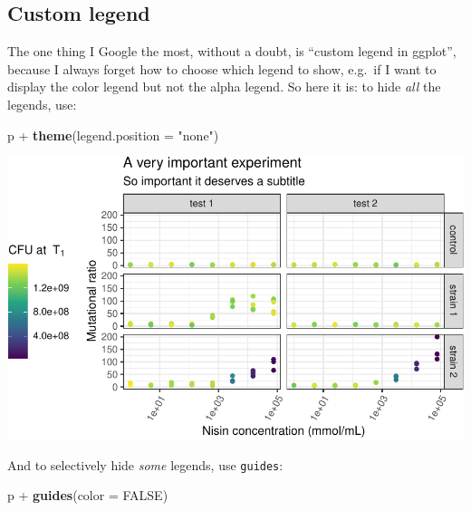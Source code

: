 \documentclass[]{book}
\newenvironment{Shaded}{}{}
\newcommand{\DataTypeTok}[1]{\textcolor[rgb]{0.56,0.13,0.00}{#1}}
\newcommand{\KeywordTok}[1]{\textcolor[rgb]{0.00,0.44,0.13}{\textbf{#1}}}
\newcommand{\NormalTok}[1]{#1}
\newcommand{\OperatorTok}[1]{\textcolor[rgb]{0.40,0.40,0.40}{#1}}
\newcommand{\OtherTok}[1]{\textcolor[rgb]{0.00,0.44,0.13}{#1}}
\newcommand{\StringTok}[1]{\textcolor[rgb]{0.25,0.44,0.63}{#1}}
\begin{document}
\hypertarget{custom-legend}{%
\subsection{Custom legend}\label{custom-legend}}

The one thing I Google the most, without a doubt, is ``custom legend in ggplot'', because I always forget how to choose which legend to show, e.g.~if I want to display the color legend but not the alpha legend. So here it is: to hide \emph{all} the legends, use:

\begin{Shaded}
\begin{Highlighting}[]
\NormalTok{p }\OperatorTok{+}\StringTok{ }\KeywordTok{theme}\NormalTok{(}\DataTypeTok{legend.position =} \StringTok{"none"}\NormalTok{)}
\end{Highlighting}
\end{Shaded}

\begin{center}\includegraphics[width=\textwidth]{TRES-Tidy-Tutorial_files/figure-latex/unnamed-chunk-145-1} \end{center}

And to selectively hide \emph{some} legends, use \texttt{guides}:

\begin{Shaded}
\begin{Highlighting}[]
\NormalTok{p }\OperatorTok{+}\StringTok{ }\KeywordTok{guides}\NormalTok{(}\DataTypeTok{color =} \OtherTok{FALSE}\NormalTok{)}
\end{Highlighting}
\end{Shaded}
\end{document}
